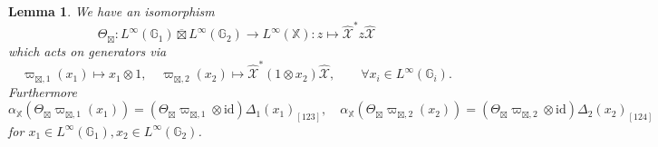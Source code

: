 \documentclass[reqno]{amsart}
\numberwithin{equation}{section}
\newtheorem{Lem}[Theorem]{Lemma}
\newcommand{\id}{\mathrm{id}}
\newcommand{\G}{\mathbb{G}}
\newcommand{\X}{\mathbb{X}}
\newcommand{\ov}{\overline}
\newcommand{\mc}{\mathcal}
\begin{document}
\begin{Lem}\label{LemBraidGGX}
We have an isomorphism
\[
\Theta_{\boxtimes}\colon L^{\infty}(\G_1) \ov{\boxtimes} L^{\infty}(\G_2)\rightarrow 
L^{\infty}(\X)\colon z \mapsto \widehat{\mc{X}}^* z \widehat{\mc{X}}
\]
which acts on generators via
\[
\varpi_{\boxtimes,1}(x_1)\mapsto x_1\otimes 1,\quad 
\varpi_{\boxtimes,2}(x_2)\mapsto \widehat{\mc{X}}^*(1\otimes x_2)\widehat{\mc{X}},\qquad \forall x_i\in L^{\infty}(\G_i).
\]
Furthermore
\begin{equation}\label{EqActionBraid}
\alpha_{\X}(\Theta_{\boxtimes} \varpi_{\boxtimes,1}(x_1)) = (\Theta_{\boxtimes}\varpi_{\boxtimes,1}\otimes \id)\Delta_1(x_1)_{[123]},\quad 
\alpha_{\X}(\Theta_{\boxtimes} \varpi_{\boxtimes,2}(x_2)) = (\Theta_{\boxtimes}\varpi_{\boxtimes,2}\otimes \id)\Delta_2(x_2)_{[124]}
\end{equation}
for $x_1 \in L^{\infty}(\G_1), x_2\in L^{\infty}(\G_2)$.
\end{Lem} 
\end{document}
